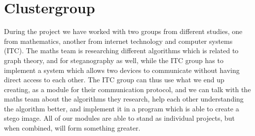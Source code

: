 \section*{Clustergroup}
During the project we have worked with two groups from different studies, one from mathematics, another from internet technology and computer systems (ITC). 
The maths team is researching different algorithms which is related to graph theory, and for steganography as well, while the ITC group has to implement a system which allows two devices to communicate without having direct access to each other.
The ITC group can thus use what we end up creating, as a module for their communication protocol, and we can talk with the maths team about the algorithms they research, help each other understanding the algorithm better, and implement it in a program which is able to create a stego image. 
All of our modules are able to stand as individual projects, but when combined, will form something greater.